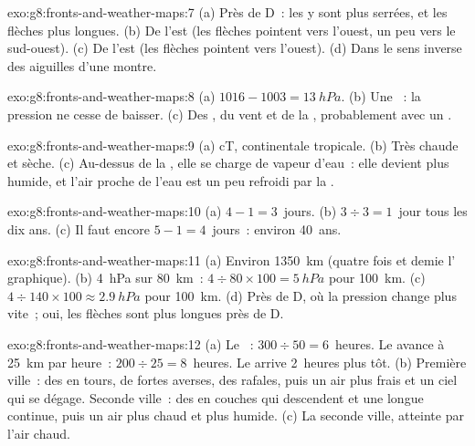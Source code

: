 \begin{solution}{exo:g8:fronts-and-weather-maps:7}
(a) Près de D~: les  y sont plus serrées, et les flèches plus
longues. (b) De l'est (les flèches pointent vers l'ouest, un peu vers le
sud-ouest). (c) De l'est (les flèches pointent vers l'ouest). (d) Dans le
sens inverse des aiguilles d'une montre.
\end{solution}

\begin{solution}{exo:g8:fronts-and-weather-maps:8}
(a) $1016 - 1003 = \qty{13}{hPa}$. (b) Une ~: la pression ne
cesse de baisser. (c) Des , du vent et de la , probablement
avec un .
\end{solution}

\begin{solution}{exo:g8:fronts-and-weather-maps:9}
(a) cT, continentale tropicale. (b) Très chaude et sèche. (c) Au-dessus de
la , elle se charge de vapeur d'eau~: elle devient plus humide, et l'air
proche de l'eau est un peu refroidi par la .
\end{solution}

\begin{solution}{exo:g8:fronts-and-weather-maps:10}
(a) $4 - 1 = 3$~jours. (b) $3 \div 3 = 1$~jour tous les dix ans. (c) Il
faut encore $5 - 1 = 4$~jours~: environ 40~ans.
\end{solution}

\begin{solution}{exo:g8:fronts-and-weather-maps:11}
(a) Environ \qty{1350}{km} (quatre fois et demie l' graphique). (b) \qty{4}{hPa}
sur \qty{80}{km}~: $4 \div 80 \times 100 = \qty{5}{hPa}$ pour
\qty{100}{km}. (c) $4 \div 140 \times 100 \approx \qty{2.9}{hPa}$ pour
\qty{100}{km}. (d) Près de D, où la pression change plus vite~; oui, les
flèches sont plus longues près de D.
\end{solution}

\begin{solution}{exo:g8:fronts-and-weather-maps:12}
(a) Le ~: $300 \div 50 = 6$~heures. Le  avance à
\qty{25}{km} par heure~: $200 \div 25 = 8$~heures. Le  arrive
2~heures plus tôt. (b) Première ville~: des  en tours, de fortes
averses, des rafales, puis un air plus frais et un ciel qui se dégage.
Seconde ville~: des  en couches qui descendent et une longue 
continue, puis un air plus chaud et plus humide. (c) La seconde ville,
atteinte par l'air chaud.
\end{solution}

